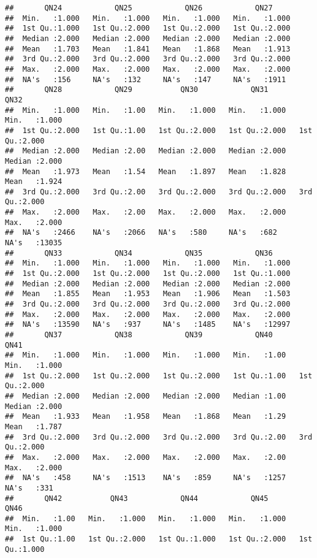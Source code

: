 \documentclass[
]{article}
\begin{document}
\begin{verbatim}
##       QN24            QN25            QN26            QN27      
##  Min.   :1.000   Min.   :1.000   Min.   :1.000   Min.   :1.000  
##  1st Qu.:1.000   1st Qu.:2.000   1st Qu.:2.000   1st Qu.:2.000  
##  Median :2.000   Median :2.000   Median :2.000   Median :2.000  
##  Mean   :1.703   Mean   :1.841   Mean   :1.868   Mean   :1.913  
##  3rd Qu.:2.000   3rd Qu.:2.000   3rd Qu.:2.000   3rd Qu.:2.000  
##  Max.   :2.000   Max.   :2.000   Max.   :2.000   Max.   :2.000  
##  NA's   :156     NA's   :132     NA's   :147     NA's   :1911   
##       QN28            QN29           QN30            QN31            QN32      
##  Min.   :1.000   Min.   :1.00   Min.   :1.000   Min.   :1.000   Min.   :1.000  
##  1st Qu.:2.000   1st Qu.:1.00   1st Qu.:2.000   1st Qu.:2.000   1st Qu.:2.000  
##  Median :2.000   Median :2.00   Median :2.000   Median :2.000   Median :2.000  
##  Mean   :1.973   Mean   :1.54   Mean   :1.897   Mean   :1.828   Mean   :1.924  
##  3rd Qu.:2.000   3rd Qu.:2.00   3rd Qu.:2.000   3rd Qu.:2.000   3rd Qu.:2.000  
##  Max.   :2.000   Max.   :2.00   Max.   :2.000   Max.   :2.000   Max.   :2.000  
##  NA's   :2466    NA's   :2066   NA's   :580     NA's   :682     NA's   :13035  
##       QN33            QN34            QN35            QN36      
##  Min.   :1.000   Min.   :1.000   Min.   :1.000   Min.   :1.000  
##  1st Qu.:2.000   1st Qu.:2.000   1st Qu.:2.000   1st Qu.:1.000  
##  Median :2.000   Median :2.000   Median :2.000   Median :2.000  
##  Mean   :1.855   Mean   :1.953   Mean   :1.906   Mean   :1.503  
##  3rd Qu.:2.000   3rd Qu.:2.000   3rd Qu.:2.000   3rd Qu.:2.000  
##  Max.   :2.000   Max.   :2.000   Max.   :2.000   Max.   :2.000  
##  NA's   :13590   NA's   :937     NA's   :1485    NA's   :12997  
##       QN37            QN38            QN39            QN40           QN41      
##  Min.   :1.000   Min.   :1.000   Min.   :1.000   Min.   :1.00   Min.   :1.000  
##  1st Qu.:2.000   1st Qu.:2.000   1st Qu.:2.000   1st Qu.:1.00   1st Qu.:2.000  
##  Median :2.000   Median :2.000   Median :2.000   Median :1.00   Median :2.000  
##  Mean   :1.933   Mean   :1.958   Mean   :1.868   Mean   :1.29   Mean   :1.787  
##  3rd Qu.:2.000   3rd Qu.:2.000   3rd Qu.:2.000   3rd Qu.:2.00   3rd Qu.:2.000  
##  Max.   :2.000   Max.   :2.000   Max.   :2.000   Max.   :2.00   Max.   :2.000  
##  NA's   :458     NA's   :1513    NA's   :859     NA's   :1257   NA's   :331    
##       QN42           QN43            QN44            QN45            QN46      
##  Min.   :1.00   Min.   :1.000   Min.   :1.000   Min.   :1.000   Min.   :1.000  
##  1st Qu.:1.00   1st Qu.:2.000   1st Qu.:1.000   1st Qu.:2.000   1st Qu.:1.000  

\end{verbatim}
\end{document}
